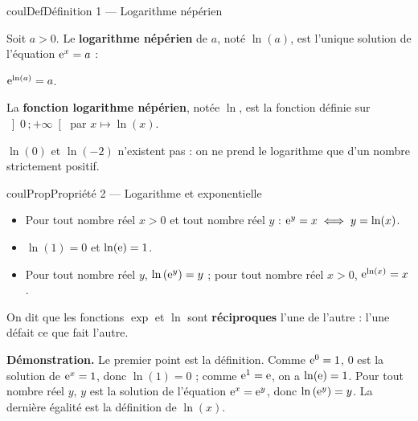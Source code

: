 \documentclass[11pt,a4paper]{article}
\makeatletter
\newcommand{\lycee@repere}[4]{%
  \draw[grille,step=1] (#1,#2) grid (#3,#4);
  \draw[-{Stealth[length=2mm]},thick] (#1,0)--({#3+0.4},0) node[below left=-1pt]{$x$};
  \draw[-{Stealth[length=2mm]},thick] (0,#2)--(0,{#4+0.4}) node[below left=-1pt]{$y$};
  \node[below left,font=\scriptsize,inner sep=1.5pt] at (0,0) {$0$};}
\newcommand{\lycee@gradx}[1]{\foreach \k/\l in {#1}{%
  \draw (\k,0.07)--(\k,-0.07) node[below,font=\scriptsize,inner sep=1.5pt]{$\l$};}}
\newcommand{\lycee@grady}[1]{\foreach \k/\l in {#1}{%
  \draw (0.07,\k)--(-0.07,\k) node[left,font=\scriptsize,inner sep=1.5pt]{$\l$};}}
\newcommand{\lycee@intoo}[2]{\left]#1\,;#2\right[}
\providecommand{\repere}{\lycee@repere}%
\providecommand{\gradx}{\lycee@gradx}%
\providecommand{\grady}{\lycee@grady}%
\providecommand{\intoo}{\lycee@intoo}%
\newcounter{lycee@signet}
\newcommand{\signet}[3][]{\stepcounter{lycee@signet}%
  \edef\lycee@dest{\if\relax\detokenize{#1}\relax
    signet.\arabic{lycee@signet}\else#1\fi}%
  \hypertarget{\lycee@dest}{}\bookmark[level=#2,dest=\lycee@dest]{#3}}
\newenvironment{definitionbox}[1][Définition]%
  {\begin{boitecours}[phantom={\signet{2}{#1}}]{coulDef}{#1}}{\end{boitecours}}
\newenvironment{proprietebox}[1][Propriété]%
  {\begin{boitecours}[phantom={\signet{2}{#1}}]{coulProp}{#1}}{\end{boitecours}}
\makeatother
\begin{document}
\begin{definitionbox}[Définition 1 --- Logarithme népérien]
\begin{minipage}[c]{0.58\linewidth}\raggedright
Soit $a>0$. Le \textbf{logarithme népérien} de $a$, noté $\ln(a)$, est l'unique
solution de l'équation $\mathrm{e}^{x}=a$ :
\begin{center}
$\mathrm{e}^{\ln(a)}=a$.
\end{center}
La \textbf{fonction logarithme népérien}, notée $\ln$, est la fonction définie sur
$\intoo{0}{+\infty}$ par $x\longmapsto\ln(x)$.

\smallskip
$\ln(0)$ et $\ln(-2)$ n'existent pas : on ne prend le logarithme que d'un nombre
strictement positif.
\end{minipage}\hfill
\begin{minipage}[c]{0.38\linewidth}\centering
{}
\end{minipage}
\end{definitionbox}

\begin{proprietebox}[Propriété 2 --- Logarithme et exponentielle]
\begin{itemize}
  \item Pour tout nombre réel $x>0$ et tout nombre réel $y$ : $\mathrm{e}^{y}=x\iff y=\ln(x)$.
  \item $\ln(1)=0$ \quad et \quad $\ln(\mathrm{e})=1$.
  \item Pour tout nombre réel $y$, $\ln\left(\mathrm{e}^{y}\right)=y$ ; pour tout nombre réel
        $x>0$, $\mathrm{e}^{\ln(x)}=x$.
\end{itemize}
On dit que les fonctions $\exp$ et $\ln$ sont \textbf{réciproques} l'une de l'autre :
l'une défait ce que fait l'autre.

\smallskip
\textbf{\color{coulMeth}Démonstration.} Le premier point est la définition. Comme
$\mathrm{e}^{0}=1$, $0$ est la solution de $\mathrm{e}^{x}=1$, donc $\ln(1)=0$ ; comme $\mathrm{e}^{1}=\mathrm{e}$, on
a $\ln(\mathrm{e})=1$. Pour tout nombre réel $y$, $y$ est la solution de l'équation
$\mathrm{e}^{x}=\mathrm{e}^{y}$, donc $\ln\left(\mathrm{e}^{y}\right)=y$. La dernière égalité est la
définition de $\ln(x)$.
\end{proprietebox}
\end{document}
